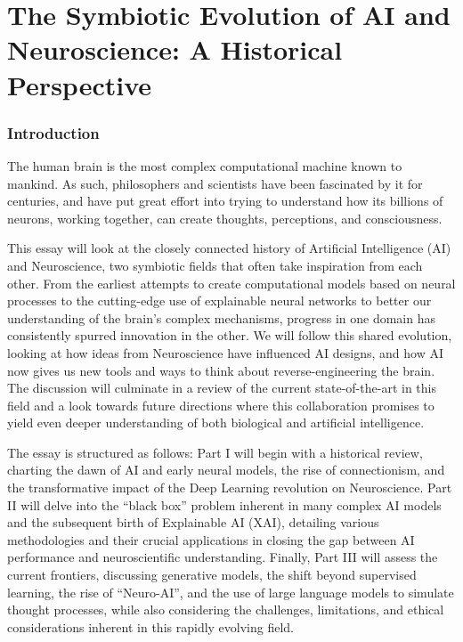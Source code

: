 \part{The Symbiotic Evolution of AI and Neuroscience: A Historical Perspective}

\section{Introduction}

The human brain is the most complex computational machine known to mankind. As such, philosophers and scientists have been fascinated by it for centuries, and have put great effort into trying to understand how its billions of neurons, working together, can create thoughts, perceptions, and consciousness.

This essay will look at the closely connected history of Artificial Intelligence (AI) and Neuroscience, two symbiotic fields that often take inspiration from each other. From the earliest attempts to create computational models based on neural processes to the cutting-edge use of explainable neural networks to better our understanding of the brain's complex mechanisms, progress in one domain has consistently spurred innovation in the other. We will follow this shared evolution, looking at how ideas from Neuroscience have influenced AI designs, and how AI now gives us new tools and ways to think about reverse-engineering the brain. The discussion will culminate in a review of the current state-of-the-art in this field and a look towards future directions where this collaboration promises to yield even deeper understanding of both biological and artificial intelligence.

The essay is structured as follows: Part I will begin with a historical review, charting the dawn of AI and early neural models, the rise of connectionism, and the transformative impact of the Deep Learning revolution on Neuroscience. Part II will delve into the ``black box'' problem inherent in many complex AI models and the subsequent birth of Explainable AI (XAI), detailing various methodologies and their crucial applications in closing the gap between AI performance and neuroscientific understanding. Finally, Part III will assess the current frontiers, discussing generative models, the shift beyond supervised learning, the rise of ``Neuro-AI'', and the use of large language models to simulate thought processes, while also considering the challenges, limitations, and ethical considerations inherent in this rapidly evolving field.


